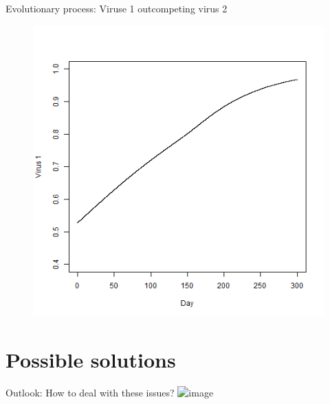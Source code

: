 \documentclass{beamer}
\begin{document}
%
%
\begin{frame}{\small Evolutionary process: Viruse 1 outcompeting virus 2}
\begin{center}
		\begin{figure}
			\includegraphics[width=.65\textwidth]{prop_virus1}
		\end{figure}
\end{center}
\end{frame}
%
\section{Possible solutions}
\begin{frame}{Outlook: How to deal with these issues?}
\centering
\includegraphics<2>[width=.6\textwidth]{blog-stay_tuned}
\end{frame}
\end{document}
